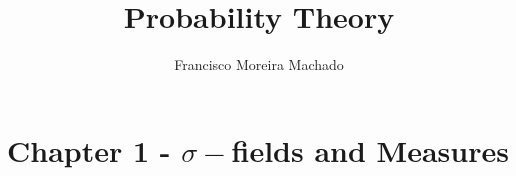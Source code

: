 \documentclass{scrartcl}
\author{Francisco Moreira Machado}
\title{Probability Theory}
\begin{document}
  \maketitle
  \section{Chapter 1 - $\sigma-$fields and Measures}
  
  
  
  
  
  
  
  
  
  
  
  
\end{document}
